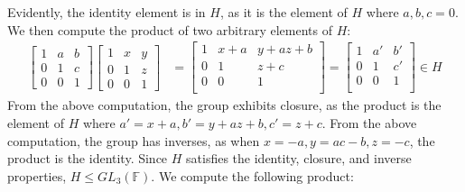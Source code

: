 \documentclass{article}
\begin{document}
Evidently, the identity element is in $H$, as it is the element of $H$ where $a, b, c = 0$. We then compute the product of two arbitrary elements of $H$:
\begin{equation}
    \begin{split}
        \begin{bmatrix}
            1 & a & b \\
            0 & 1 & c \\
            0 & 0 & 1 
        \end{bmatrix}
        \begin{bmatrix}
            1 & x & y \\
            0 & 1 & z \\
            0 & 0 & 1 
        \end{bmatrix}
        & = 
        \begin{bmatrix}
            1 & x + a & y + az + b \\
            0 & 1 & z + c \\
            0 & 0 & 1 \\
        \end{bmatrix} = 
        \begin{bmatrix}
            1 & a' & b' \\
            0 & 1 & c' \\
            0 & 0 & 1 \\
        \end{bmatrix}\in H
    \end{split}
\end{equation}
From the above computation, the group exhibits closure, as the product is the element of $H$ where $a' = x + a, b' = y + az + b, c' = z + c$. From the above computation, the group has inverses, as when $x = -a, y = ac - b, z = -c$, the product is the identity. Since $H$ satisfies the identity, closure, and inverse properties, $H \leq GL_3\left(\mathbb{F}\right)$.
We compute the following product:
\end{document}
